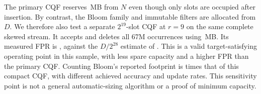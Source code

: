 The primary CQF reserves \PrimaryCqfMemory{}\,MB from $N$ even though only \SkewOccupiedLarge{} slots are occupied after insertion. By contrast, the Bloom family and immutable filters are allocated from $D$. We therefore also test a separate $2^{19}$-slot CQF at $r=9$ on the same complete skewed stream. It accepts and deletes all 67M occurrences using \CompactMemory{}\,MB. Its measured FPR is \CompactFpr{}, against the $D/2^{28}$ estimate of \CompactExpectedFpr{}. This is a valid target-satisfying operating point in this sample, with less spare capacity and a higher FPR than the primary CQF. Counting Bloom's reported footprint is \CompactCbfMemoryRatio{} times that of this compact CQF, with different achieved accuracy and update rates. This sensitivity point is not a general automatic-sizing algorithm or a proof of minimum capacity.
\clearpage
